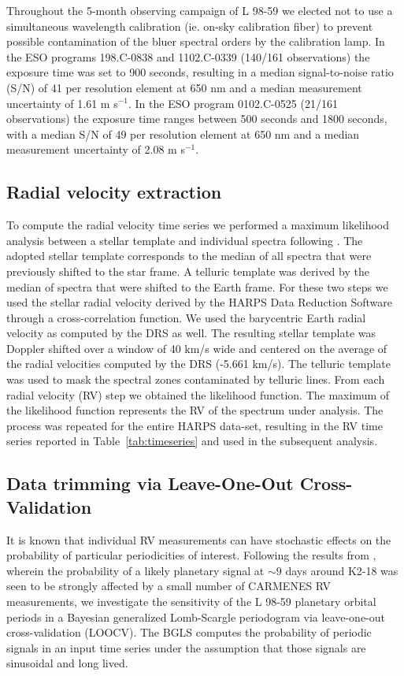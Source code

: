 \documentclass[longauth]{aa}
\newcommand{\mps}{m s$^{-1}$}
\begin{document}
Throughout the 5-month observing campaign of L 98-59 we elected not to use a simultaneous wavelength calibration 
(ie. on-sky calibration fiber) to prevent possible contamination of the bluer spectral orders by the calibration lamp. In the ESO programs 198.C-0838 and 1102.C-0339 (140/161 observations) the exposure time was set to 900 seconds, resulting in a median signal-to-noise ratio (S/N) of 41 per resolution element at 650 nm and a median measurement uncertainty of 1.61 \mps{.} In the ESO program 0102.C-0525 (21/161 observations) the exposure time ranges between 500 seconds and 1800 seconds, with a median S/N of 49 per resolution element at 650 nm and a median measurement uncertainty of 2.08 \mps{.} 

\subsection{Radial velocity extraction}

To compute the radial velocity time series we performed a maximum likelihood analysis between a stellar
template and individual spectra following \citet{astudillodefru17a}. The adopted stellar template corresponds
to the median of all spectra that were previously shifted to the star frame. A telluric template was 
derived by the median of spectra that were shifted to the Earth frame. For these two steps we used the 
stellar radial velocity derived by the HARPS Data Reduction Software \citep[DRS;][]{lovis07} through a cross-correlation
function. We used the barycentric Earth radial velocity as computed by the DRS as well. The resulting stellar template 
was Doppler shifted over a window of 40 km/s wide and centered on the average of the radial velocities 
computed by the DRS (-5.661 km/s). The telluric template was used to mask the spectral zones contaminated 
by telluric lines. From each radial velocity (RV) step we obtained the likelihood function. The maximum of the likelihood
function represents the RV of the spectrum under analysis. The process was repeated for the entire HARPS
data-set, resulting in the RV time series reported in Table~\ref{tab:timeseries} and used in the subsequent
analysis.

\iffalse
\subsection{Data trimming via Leave-One-Out Cross-Validation}
\label{subsec:loocv}
It is known that individual RV measurements can have stochastic effects on the probability of particular periodicities of interest. Following the results from  \citep{cloutier19}, wherein the probability of a likely planetary signal at $\sim 9$ days around K2-18 was seen to be strongly affected by a small number of CARMENES RV measurements, we investigate the sensitivity of the L 98-59 planetary orbital periods in a Bayesian generalized Lomb-Scargle periodogram \citep[BGLS;][]{mortier16} via leave-one-out cross-validation (LOOCV). The BGLS computes the probability of periodic signals in an input time series under the assumption that those signals are sinusoidal and long lived.
\end{document}
